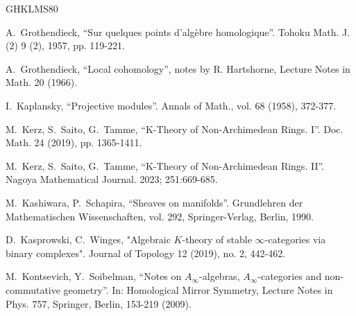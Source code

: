 \documentclass[11pt,leqno]{amsart}
\numberwithin{equation}{section}
\begin{document}
\begin{thebibliography}{GHKLMS80}



 A.~Grothendieck, ``Sur quelques points d'alg\`ebre homologique''.
Tohoku Math. J. (2) 9 (2), 1957, pp. 119-221.

 A.~Grothendieck, ``Local cohomology'', notes by R. Hartshorne, Lecture Notes in Math. 20
(1966).



I.~Kaplansky, ``Projective modules''. Annals of Math., vol. 68 (1958), 372-377.

M.~Kerz, S.~Saito, G.~Tamme, ``K-Theory of Non-Archimedean Rings. I''. Doc. Math. 24 (2019), pp. 1365-1411.

M.~Kerz, S.~Saito, G.~Tamme, ``K-Theory of Non-Archimedean Rings. II''. Nagoya Mathematical Journal. 2023; 251:669-685.

M.~Kashiwara, P.~Schapira, ``Sheaves on manifolds''. Grundlehren der Mathematischen Wissenschaften, vol. 292, Springer-Verlag, Berlin, 1990.


 D.~Kasprowski, C.~Winges, "Algebraic $K$-theory of stable $\infty$-categories via binary complexes". Journal of Topology 12 (2019), no. 2, 442-462.


 M.~Kontsevich, Y.~Soibelman, ``Notes on $A_{\infty}$-algebras, $A_{\infty}$-categories and non-commutative geometry''. In: Homological Mirror Symmetry, Lecture Notes in Phys. 757,
Springer, Berlin, 153-219 (2009).


\end{thebibliography}
\end{document}
